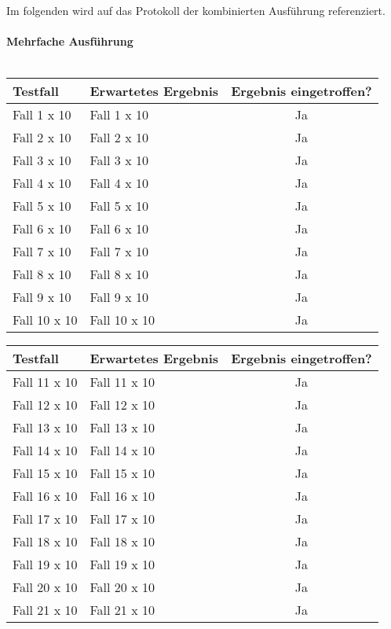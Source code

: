 \ \\ \\
Im folgenden wird auf das Protokoll der kombinierten Ausführung referenziert.\ \\ \\
\textbf{Mehrfache Ausführung}\ \\ \\
\begin{tabular}[c]{|p{6cm}|p{6cm}|c|}
\hline
\textbf{Testfall} & \textbf{Erwartetes Ergebnis} & \textbf{Ergebnis eingetroffen?}\\
\hline
Fall 1 x 10 & Fall 1 x 10 & Ja\\
\hline
Fall 2 x 10 & Fall 2 x 10 & Ja\\
\hline
Fall 3 x 10 & Fall 3 x 10 & Ja\\
\hline
Fall 4 x 10 & Fall 4 x 10 & Ja\\
\hline
Fall 5 x 10 & Fall 5 x 10 & Ja\\
\hline
Fall 6 x 10 & Fall 6 x 10 & Ja\\
\hline
Fall 7 x 10 & Fall 7 x 10 & Ja\\
\hline
Fall 8 x 10 & Fall 8 x 10 & Ja\\
\hline
Fall 9 x 10 & Fall 9 x 10 & Ja\\
\hline
Fall 10 x 10 & Fall 10 x 10 & Ja\\
\hline
\end{tabular}
\begin{tabular}[c]{|p{6cm}|p{6cm}|c|}
\hline
\textbf{Testfall} & \textbf{Erwartetes Ergebnis} & \textbf{Ergebnis eingetroffen?}\\
\hline
Fall 11 x 10 & Fall 11 x 10 & Ja\\
\hline
Fall 12 x 10 & Fall 12 x 10 & Ja\\
\hline
Fall 13 x 10 & Fall 13 x 10 & Ja\\
\hline
Fall 14 x 10 & Fall 14 x 10 & Ja\\
\hline
Fall 15 x 10 & Fall 15 x 10 & Ja\\
\hline
Fall 16 x 10 & Fall 16 x 10 & Ja\\
\hline
Fall 17 x 10 & Fall 17 x 10 & Ja\\
\hline
Fall 18 x 10 & Fall 18 x 10 & Ja\\
\hline
Fall 19 x 10 & Fall 19 x 10 & Ja\\
\hline
Fall 20 x 10 & Fall 20 x 10 & Ja\\
\hline
Fall 21 x 10 & Fall 21 x 10 & Ja\\
\hline
\end{tabular}

